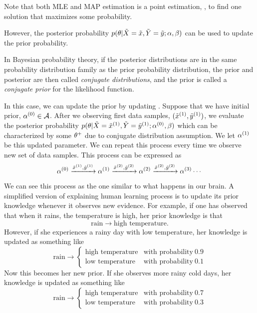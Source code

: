 Note that both MLE and MAP estimation is a point estimation,
\ie, to find one solution that maximizes some probability.

However, the posterior probability $p(\theta|\tilde{X}=\tilde{x}, \tilde{Y}=\tilde{y}; \alpha, \beta)$ can be used to update the prior probability.

In Bayesian probability theory,
if the posterior distributions are in the same probability distribution family
as the prior probability distribution,
the prior and posterior are then called \emph{conjugate distributions},
and the prior is called a \emph{conjugate prior} for the likelihood function.

In this case, we can update the prior by updating \prior.
Suppose that we have initial prior, $\alpha^{(0)} \in \mathcal{A}$.
After we observing first data samples, $(\tilde{x}^{(1)}, \tilde{y}^{(1)})$,
we evaluate the posterior probability $p(\theta|\tilde{X}=\tilde{x}^{(1)}, \tilde{Y}=\tilde{y}^{(1)}; \alpha^{(0)}, \beta)$
which can be characterized by some $\theta^+$ due to conjugate distribution assumption.
We let $\alpha^{(1)}$ be this updated parameter.
We can repeat this process every time we observe new set of data samples.
This process can be expressed as
\begin{equation}
\alpha^{(0)}
\xrightarrow{\tilde{x}^{(1)}, \tilde{y}^{(1)}}
\alpha^{(1)}
\xrightarrow{\tilde{x}^{(2)}, \tilde{y}^{(2)}}
\alpha^{(2)}
\xrightarrow{\tilde{x}^{(2)}, \tilde{y}^{(2)}}
\alpha^{(3)}
\cdots
\end{equation}

We can see this process as the one similar to what happens in our brain.
A simplified version of explaining human learning process is
to update its prior knowledge whenever it observes new evidence.
For example,
if one has observed that when it rains,
the temperature is high,
her prior knowledge is that
\begin{equation}
\text{rain} \rightarrow \text{high temperature}.
\end{equation}
However, if she experiences a rainy day with low temperature,
her knowledge is updated as something like
\begin{equation}
\text{rain} \rightarrow \left\{\begin{array}{ll}
\text{high temperature} &\text{with probability}\ 0.9
\\
\text{low temperature} &\text{with probability}\ 0.1
\end{array}\right.
\end{equation}
Now this becomes her new prior.
If she observes more rainy cold days,
her knowledge is updated as something like
\begin{equation}
\text{rain} \rightarrow \left\{\begin{array}{ll}
\text{high temperature} &\text{with probability}\ 0.7
\\
\text{low temperature} &\text{with probability}\ 0.3
\end{array}\right.
\end{equation}

